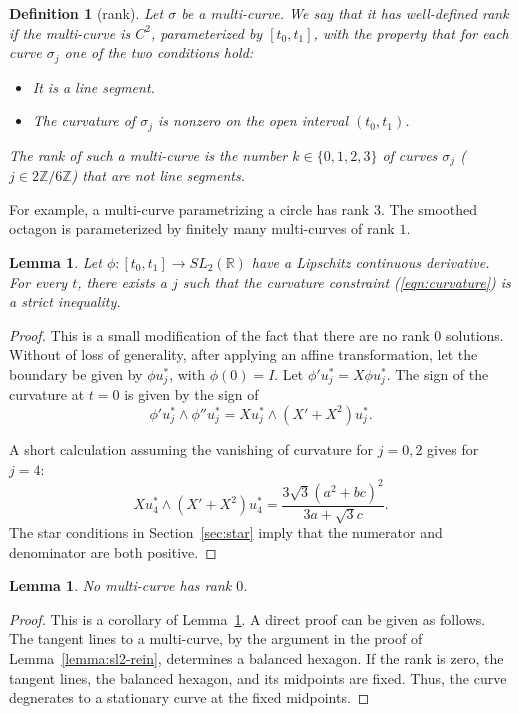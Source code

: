 \documentclass[11pt]{amsart}
\newtheorem{definition}[equation]{Definition}
\newtheorem{lemma}[equation]{Lemma}
\newcommand{\ring}[1]{\mathbb{#1}}
\def\rZ{{\ring{Z}}}
\begin{document}
\begin{definition}[rank]\label{def:rank}
Let $\sigma$ be a multi-curve.  We say that
it has {\it well-defined rank} if the multi-curve is $C^2$,
parameterized by $[t_0,t_1]$, with
the property that for each curve $\sigma_j$ one of the two conditions
hold:
\begin{itemize}
\item It is a line segment.
\item The curvature of $\sigma_j$
is nonzero on the open interval $(t_0,t_1)$.
\end{itemize}
The {\it rank} of such a multi-curve is the number $k\in\{0,1,2,3\}$ of curves $\sigma_{j}$ ($j\in2\rZ/6\rZ$) 
that
are {\it not} line segments.
\end{definition}
For example, a multi-curve parametrizing a circle
has rank $3$.  The smoothed octagon is parameterized by finitely many
multi-curves of rank $1$.  


\begin{lemma}\label{lemma:curvature}  
Let $\phi:[t_0,t_1]\to SL_2(\ring{R})$ have a Lipschitz
continuous derivative.  For every $t$, there exists a $j$ such that the curvature constraint (\ref{eqn:curvature}) is a strict inequality.
\end{lemma}

\begin{proof}  %
  This is a small modification of the fact that there are no rank $0$
  solutions.  Without of loss of generality, after applying an affine
  transformation, let the boundary be given by $\phi u^*_j$, with
  $\phi(0)=I$.  Let $\phi' u^*_j = X\phi u^*_j$.  The sign of the
  curvature at $t=0$ is given by the sign of
$$
\phi' u^*_j \land \phi'' u^*_j = X u^*_j \land (X' + X^2) u^*_j.
$$

A short calculation
assuming the vanishing of curvature for $j=0,2$ gives for $j=4$:
$$
X u^*_4 \land (X' + X^2) u^*_4 = \frac{3\sqrt{3} (a^2 + b c)^2}{3 a + \sqrt{3} c}.
$$
The star conditions in Section~\ref{sec:star} imply that the numerator and denominator are both positive.
\end{proof}

\begin{lemma}
No multi-curve has rank $0$.
\end{lemma}

\begin{proof}  This is a corollary of Lemma~\ref{lemma:curvature}.  A direct proof can
   be given as follows.
  The tangent lines to a multi-curve, by the argument in the proof of
  Lemma~\ref{lemma:sl2-rein}, determines a balanced hexagon.  If the
  rank is zero, the tangent lines, the balanced hexagon, and its
  midpoints are fixed.  Thus, the curve degnerates to a stationary
  curve at the fixed midpoints.
\end{proof}
\end{document}
